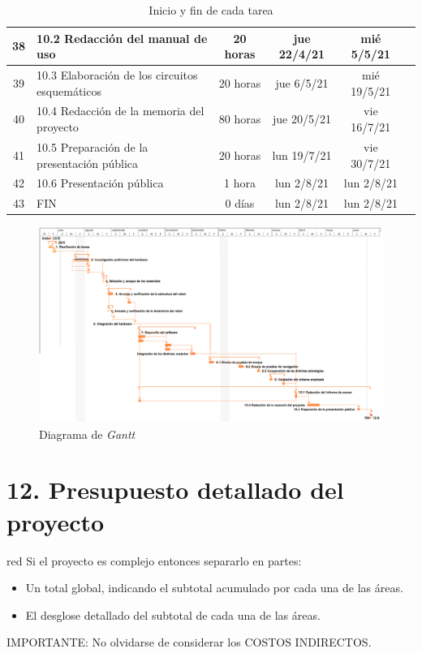 \documentclass[
11pt, %
codirector, %
]{charter}
\begin{document}
\begin{table}[htbp]
{\begin{tabular}{|c|p{25em}|c|c|c|c|}
\hline 38 & 10.2 Redacción del manual de uso & 20 horas & jue 22/4/21 & mié 5/5/21 &  \\
\hline 39 & 10.3 Elaboración de los circuitos esquemáticos & 20 horas & jue 6/5/21 & mié 19/5/21 &  \\
\hline 40 & 10.4 Redacción de la memoria del proyecto & 80 horas & jue 20/5/21 & vie 16/7/21 &  \\
\hline 41 & 10.5 Preparación de la presentación pública & 20 horas & lun 19/7/21 & vie 30/7/21 &  \\
\hline 42 & 10.6 Presentación pública & 1 hora & lun 2/8/21 & lun 2/8/21 &  \\
\hline 43 & FIN   & 0 días & lun 2/8/21 & lun 2/8/21 &  \\
\hline
\end{tabular}}
\caption{Inicio y fin de cada tarea}
\label{tab:CuadroGantt}
\end{table}

\newpage
\begin{landscape}
\begin{figure}[htpb]
\includegraphics[width=1.6\textwidth]{./Figuras/gtant_fin.png}
\caption{Diagrama de \textit{Gantt}}
\label{fig:Gantt}
\end{figure}
\end{landscape}

\section{12. Presupuesto detallado del proyecto}
\label{sec:presupuesto}

\begin{consigna}{red}
Si el proyecto es complejo entonces separarlo en partes:
\begin{itemize}
	\item Un total global, indicando el subtotal acumulado por cada una de las áreas.
	\item El desglose detallado del subtotal de cada una de las áreas.
\end{itemize}

IMPORTANTE: No olvidarse de considerar los COSTOS INDIRECTOS.

\end{consigna}
\end{document}
